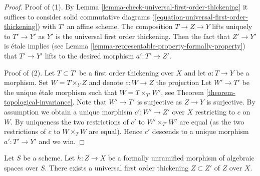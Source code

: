 \begin{proof}
Proof of (1). By
Lemma \ref{lemma-check-universal-first-order-thickening}
it suffices to consider solid commutative diagrams
(\ref{equation-universal-first-order-thickening})
with $T'$ an affine scheme. The composition
$T \to Z \to Y$ lifts uniquely to $T' \to Y'$ as $Y'$ is
the universal first order thickening. Then the fact that
$Z' \to Y'$ is \'etale implies (see
Lemma \ref{lemma-representable-property-formally-property})
that $T' \to Y'$ lifts to the
desired morphism $a' : T' \to Z'$.

\medskip\noindent
Proof of (2). Let $T \subset T'$ be a first order thickening over
$X$ and let $a : T \to Y$ be a morphism. Set $W = T \times_Y Z$
and denote $c : W \to Z$ the projection
Let $W' \to T'$ be the unique \'etale morphism such that
$W = T \times_{T'} W'$, see
Theorem \ref{theorem-topological-invariance}.
Note that $W' \to T'$ is surjective as $Z \to Y$ is surjective.
By assumption we obtain a unique morphism $c' : W' \to Z'$
over $X$ restricting to $c$ on $W$. By uniqueness the two restrictions
of $c'$ to $W' \times_{T'} W'$ are equal (as the two restrictions of
$c$ to $W \times_T W$ are equal). Hence $c'$ descends to a unique
morphism $a' : T' \to Y'$ and we win.
\end{proof}

\begin{lemma}
\label{lemma-universal-thickening}
Let $S$ be a scheme.
Let $h : Z \to X$ be a formally unramified morphism of algebraic
spaces over $S$.
There exists a universal first order thickening $Z \subset Z'$ of
$Z$ over $X$.
\end{lemma}

